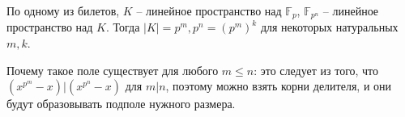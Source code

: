 По одному из билетов, $K$ -- линейное пространство над $\mathbb{F}_p$, $\mathbb{F}_{p^n}$ -- линейное пространство над $K$. Тогда $|K| = p^m, p^n = (p^m)^k$ для некоторых натуральных $m, k$. 

Почему такое поле существует для любого $m \leq n$: это следует из того, что $(x^{p^m} - x)|(x^{p^n} - x)$ для $m|n$, поэтому можно взять корни делителя, и они будут образовывать подполе нужного размера.